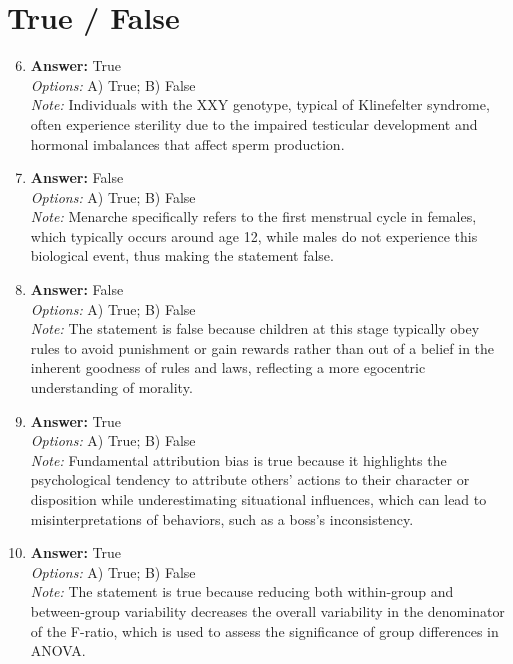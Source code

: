 \documentclass[12pt]{article}
\begin{document}
\section*{True / False}
\begin{enumerate}[label=\arabic*.]
\setcounter{enumi}{5}
\item \textbf{Answer:} True
\\ \textit{Options:} A) True; B) False
\\ \textit{Note:} Individuals with the XXY genotype, typical of Klinefelter syndrome, often experience sterility due to the impaired testicular development and hormonal imbalances that affect sperm production.
\item \textbf{Answer:} False
\\ \textit{Options:} A) True; B) False
\\ \textit{Note:} Menarche specifically refers to the first menstrual cycle in females, which typically occurs around age 12, while males do not experience this biological event, thus making the statement false.
\item \textbf{Answer:} False
\\ \textit{Options:} A) True; B) False
\\ \textit{Note:} The statement is false because children at this stage typically obey rules to avoid punishment or gain rewards rather than out of a belief in the inherent goodness of rules and laws, reflecting a more egocentric understanding of morality.
\item \textbf{Answer:} True
\\ \textit{Options:} A) True; B) False
\\ \textit{Note:} Fundamental attribution bias is true because it highlights the psychological tendency to attribute others' actions to their character or disposition while underestimating situational influences, which can lead to misinterpretations of behaviors, such as a boss's inconsistency.
\item \textbf{Answer:} True
\\ \textit{Options:} A) True; B) False
\\ \textit{Note:} The statement is true because reducing both within-group and between-group variability decreases the overall variability in the denominator of the F-ratio, which is used to assess the significance of group differences in ANOVA.
\end{enumerate}
\end{document}
